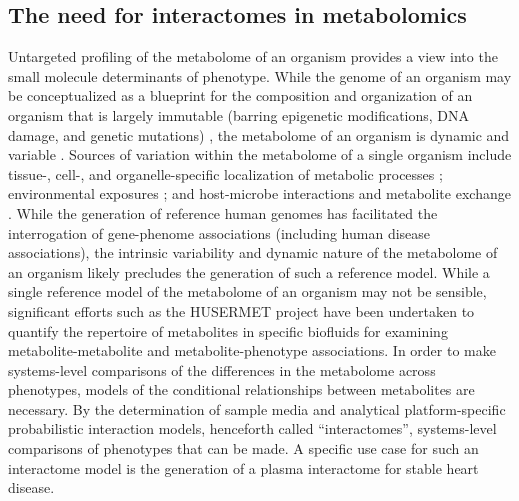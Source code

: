 \begin{DoubleSpace*}

\section{The need for interactomes in metabolomics}
Untargeted profiling of the metabolome of an organism provides a view into the small molecule determinants of phenotype. While the genome of an organism may be conceptualized as a blueprint for the composition and organization of an organism that is largely immutable (barring epigenetic modifications, DNA damage, and genetic mutations) \cite{gao2015,keating2015,martincorena2015}, the metabolome of an organism is dynamic and variable \cite{dallmann2012,krycer2017}. Sources of variation within the metabolome of a single organism include tissue-, cell-, and organelle-specific localization of metabolic processes \cite{shlomi2008,voet2013}; environmental exposures \cite{southam2014}; and host-microbe interactions and metabolite exchange \cite{moriya2017}. While the generation of reference human genomes has facilitated the interrogation of gene-phenome associations (including human disease associations), the intrinsic variability and dynamic nature of the metabolome of an organism likely precludes the generation of such a reference model. While a single reference model of the metabolome of an organism may not be sensible, significant efforts such as the HUSERMET project \cite{dunn2014} have been undertaken to quantify the repertoire of metabolites in specific biofluids for examining metabolite-metabolite and metabolite-phenotype associations. In order to make systems-level comparisons of the differences in the metabolome across phenotypes, models of the conditional relationships between metabolites are necessary. By the determination of sample media and analytical platform-specific probabilistic interaction models, henceforth called ``interactomes'', systems-level comparisons of phenotypes that can be made. A specific use case for such an interactome model is the generation of a plasma interactome for stable heart disease.


\end{DoubleSpace*}

